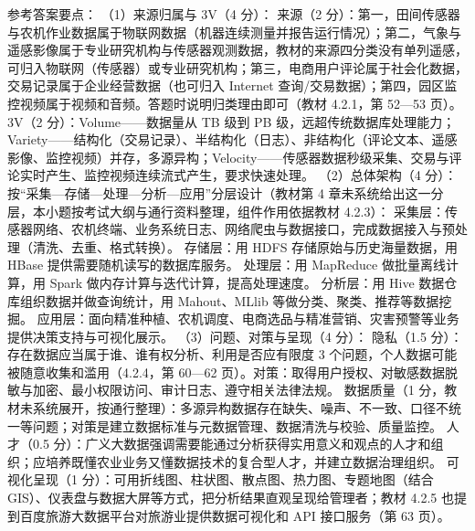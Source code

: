 \documentclass[a4paper,11pt]{article}
\begin{document}

\q 参考答案要点：
（1）来源归属与 3V（4 分）：
来源（2 分）：第一，田间传感器与农机作业数据属于物联网数据（机器连续测量并报告运行情况）；第二，气象与遥感影像属于专业研究机构与传感器观测数据，教材的来源四分类没有单列遥感，可归入物联网（传感器）或专业研究机构；第三，电商用户评论属于社会化数据，交易记录属于企业经营数据（也可归入 Internet 查询/交易数据）；第四，园区监控视频属于视频和音频。答题时说明归类理由即可（教材 4.2.1，第 52—53 页）。
3V（2 分）：Volume——数据量从 TB 级到 PB 级，远超传统数据库处理能力；Variety——结构化（交易记录）、半结构化（日志）、非结构化（评论文本、遥感影像、监控视频）并存，多源异构；Velocity——传感器数据秒级采集、交易与评论实时产生、监控视频连续流式产生，要求快速处理。
（2）总体架构（4 分）：按“采集—存储—处理—分析—应用”分层设计（教材第 4 章未系统给出这一分层，本小题按考试大纲与通行资料整理，组件作用依据教材 4.2.3）：
采集层：传感器网络、农机终端、业务系统日志、网络爬虫与数据接口，完成数据接入与预处理（清洗、去重、格式转换）。
存储层：用 HDFS 存储原始与历史海量数据，用 HBase 提供需要随机读写的数据库服务。
处理层：用 MapReduce 做批量离线计算，用 Spark 做内存计算与迭代计算，提高处理速度。
分析层：用 Hive 数据仓库组织数据并做查询统计，用 Mahout、MLlib 等做分类、聚类、推荐等数据挖掘。
应用层：面向精准种植、农机调度、电商选品与精准营销、灾害预警等业务提供决策支持与可视化展示。
（3）问题、对策与呈现（4 分）：
隐私（1.5 分）：存在数据应当属于谁、谁有权分析、利用是否应有限度 3 个问题，个人数据可能被随意收集和滥用（4.2.4，第 60—62 页）。对策：取得用户授权、对敏感数据脱敏与加密、最小权限访问、审计日志、遵守相关法律法规。
数据质量（1 分，教材未系统展开，按通行整理）：多源异构数据存在缺失、噪声、不一致、口径不统一等问题；对策是建立数据标准与元数据管理、数据清洗与校验、质量监控。
人才（0.5 分）：广义大数据强调需要能通过分析获得实用意义和观点的人才和组织；应培养既懂农业业务又懂数据技术的复合型人才，并建立数据治理组织。
可视化呈现（1 分）：可用折线图、柱状图、散点图、热力图、专题地图（结合 GIS）、仪表盘与数据大屏等方式，把分析结果直观呈现给管理者；教材 4.2.5 也提到百度旅游大数据平台对旅游业提供数据可视化和 API 接口服务（第 63 页）。
\end{document}
